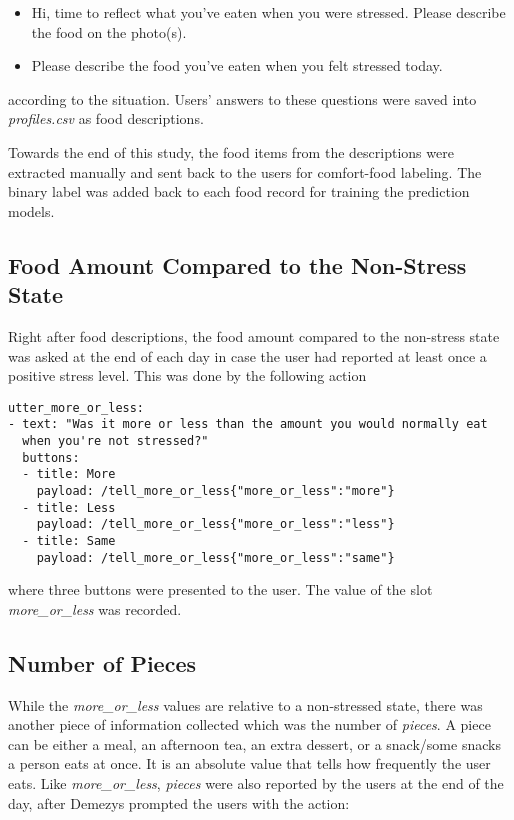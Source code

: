 \begin{itemize}
  \item Hi, time to reflect what you've eaten when you were stressed. Please describe the food on the photo(s).
  \item Please describe the food you've eaten when you felt stressed today.
\end{itemize}

\noindent according to the situation. Users' answers to these questions were saved into \emph{profiles.csv} as food descriptions.

Towards the end of this study, the food items from the descriptions were extracted manually and sent back to the users for comfort-food labeling. The binary label was added back to each food record for training the prediction models.

\subsection{Food Amount Compared to the Non-Stress State}
Right after food descriptions, the food amount compared to the non-stress state was asked at the end of each day in case the user had reported at least once a positive stress level. This was done by the following action

\begin{lstlisting}
utter_more_or_less:
- text: "Was it more or less than the amount you would normally eat
  when you're not stressed?"
  buttons:
  - title: More
    payload: /tell_more_or_less{"more_or_less":"more"}
  - title: Less
    payload: /tell_more_or_less{"more_or_less":"less"}
  - title: Same
    payload: /tell_more_or_less{"more_or_less":"same"}
\end{lstlisting}

\noindent where three buttons were presented to the user. The value of the slot \emph{more\_or\_less} was recorded.

\subsection{Number of Pieces}
While the \emph{more\_or\_less} values are relative to a non-stressed state, there was another piece of information collected which was the number of \emph{pieces}. A piece can be either a meal, an afternoon tea, an extra dessert, or a snack/some snacks a person eats at once. It is an absolute value that tells how frequently the user eats. Like \emph{more\_or\_less}, \emph{pieces} were also reported by the users at the end of the day, after Demezys prompted the users with the action:

